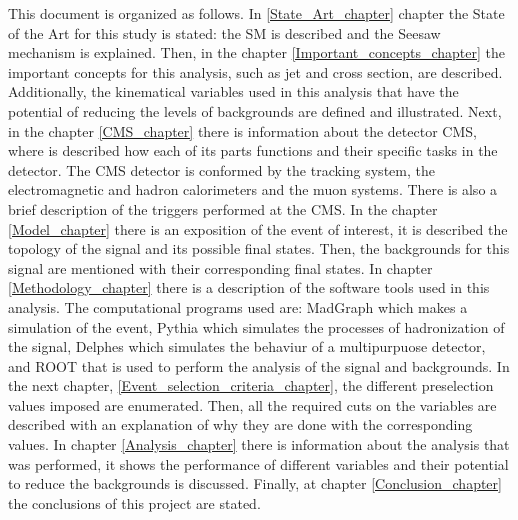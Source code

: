 This document is organized as follows. In \ref{State_Art_chapter} chapter the State of the Art for this study is stated: the SM is described and the Seesaw mechanism is explained. Then, in the chapter \ref{Important_concepts_chapter} the important concepts for this analysis, such as jet and cross section, are described. Additionally, the kinematical variables used in this analysis that have the potential of reducing the levels of backgrounds are defined and illustrated. Next, in the chapter \ref{CMS_chapter} there is information about the detector CMS, where is described how each of its parts functions and their specific tasks in the detector. The CMS detector is conformed by the tracking system, the electromagnetic and hadron calorimeters and the muon systems. There is also a brief description of the triggers performed at the CMS. In the chapter \ref{Model_chapter} there is an exposition of the event of interest, it is described the topology of the signal and its possible final states. Then, the backgrounds for this signal are mentioned with their corresponding final states. In chapter \ref{Methodology_chapter} there is a description of the software tools used in this analysis. The computational programs used are: MadGraph which makes a simulation of the event, Pythia which simulates the processes of hadronization of the signal, Delphes which simulates the behaviur of a multipurpuose detector, and ROOT that is used to perform the analysis of the signal and backgrounds. In the next chapter, \ref{Event_selection_criteria_chapter}, the different preselection values imposed are enumerated. Then, all the required cuts on the variables are described with an explanation of why they are done with the corresponding values. In chapter \ref{Analysis_chapter} there is information about the analysis that was performed, it shows the performance of different variables and their potential to reduce the backgrounds is discussed. Finally, at chapter \ref{Conclusion_chapter} the conclusions of this project are stated. 
